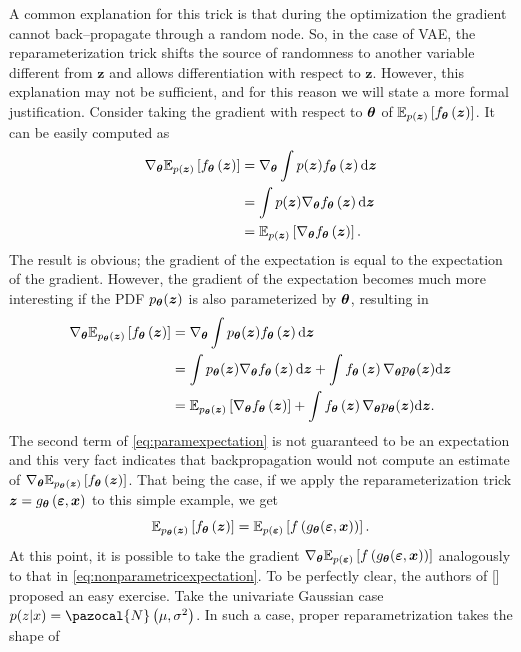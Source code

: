 A common explanation for this trick is that during the optimization the gradient cannot back--propagate through a random node. So, in the case of VAE, the reparameterization trick shifts the source of randomness to another variable different from $\boldsymbol{z}$ and allows differentiation with respect to $\boldsymbol{z}$. However, this explanation may not be sufficient, and for this reason we will state a more formal justification. Consider taking the gradient with respect to $\bt$ of $\mathbb{E}_{p(\bz)}\left[\model{z} \right]$. It can be easily computed as
\begin{align}
    \nabla_{\bt}  \mathbb{E}_{p(\bz)}\left[\model{z} \right] &= \nabla_{\bt} \int p(\bz) \model{z} \d{\bz} \\
    &= \int p(\bz) \nabla_{\bt} \model{z} \d{\bz} \\
    &=  \mathbb{E}_{p(\bz)}\left[\nabla_{\bt}\model{z} \right].\label{eq:nonparametricexpectation}
\end{align}
The result is obvious; the gradient of the expectation is equal to the expectation of the gradient. However, the gradient of the expectation becomes much more interesting if the PDF $p_{\bt}(\bz)$ is also parameterized by $\bt$, resulting in 
\begin{align}
    \nabla_{\bt}  \mathbb{E}_{p_{\bt}(\bz)}\left[\model{z} \right] &= \nabla_{\bt} \int p_{\bt}(\bz) \model{z} \d{\bz} \\
    &= \int p_{\bt}(\bz) \nabla_{\bt} \model{z} \d{\bz} + \int  \model{z} \nabla_{\bt}p_{\bt}(\bz)\d{\bz} \\
    &=  \mathbb{E}_{p_{\bt}(\bz)}\left[\nabla_{\bt}\model{z} \right] + \int  \model{z} \nabla_{\bt}p_{\bt}(\bz)\d{\bz}. \label{eq:paramexpectation}
\end{align}
The second term of \eqref{eq:paramexpectation} is not guaranteed to be an expectation and this very fact indicates that backpropagation would not compute an estimate of $\nabla_{\bt}  \mathbb{E}_{p_{\bt}(\bz)}\left[\model{z} \right]$. That being the case, if we apply the reparameterization trick $\bz =g_{\bt}\left(\boldsymbol{\varepsilon},\bx\right)$ to this simple example, we get
\begin{equation}
\mathbb{E}_{p_{\bt}(\bz)}\left[\model{z} \right] = \mathbb{E}_{p(\boldsymbol{\varepsilon})}\left[f\left(g_{\bt}(\boldsymbol{\varepsilon}, \bx)\right) \right].
\end{equation}
At this point, it is possible to take the gradient $\nabla_{\bt} \mathbb{E}_{p(\boldsymbol{\varepsilon})}\left[f\left(g_{\bt}(\boldsymbol{\varepsilon}, \bx)\right) \right]$ analogously to that in \eqref{eq:nonparametricexpectation}. To be perfectly clear, the authors of [] proposed an easy exercise. Take the univariate Gaussian case $p(z|x) = \pazocal{N}\left(\mu, \sigma^2\right)$. In such a case, proper reparametrization takes the shape of
